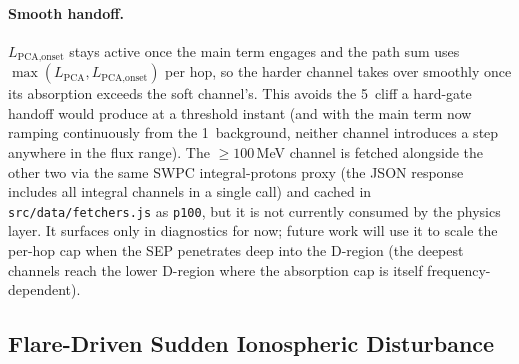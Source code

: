 \documentclass[11pt,a4paper]{article}
\newcommand{\SI}[2]{#1\,\text{#2}}
\newcommand{\dB}{\text{dB}}
\begin{document}
\paragraph{Smooth handoff.}  $L_{\text{PCA,onset}}$ stays active
once the main term engages and the path sum uses
$\max(L_{\text{PCA}}, L_{\text{PCA,onset}})$ per hop, so the harder
channel takes over smoothly once its absorption exceeds the soft
channel's.  This avoids the \SI{5}{\dB} cliff a hard-gate handoff
would produce at a threshold instant (and with the main term now
ramping continuously from the \SI{1}{pfu} background, neither
channel introduces a step anywhere in the flux range). The $\geq 100$\,MeV channel is fetched alongside the other
two via the same SWPC integral-protons proxy (the JSON response
includes all integral channels in a single call) and cached in
\texttt{src/data/fetchers.js} as \texttt{p100}, but it is not
currently consumed by the physics layer. It surfaces only in
diagnostics for now; future work will use it to scale the per-hop
cap when the SEP penetrates deep into the D-region (the deepest
channels reach the lower D-region where the absorption cap is
itself frequency-dependent).

\subsection{Flare-Driven Sudden Ionospheric Disturbance}\label{sec:lflare}
\end{document}
